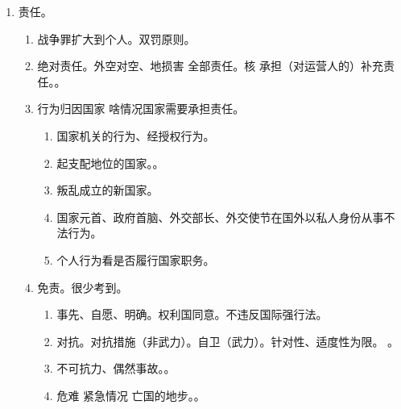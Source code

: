 \begin{enumerate}
\begin{enumerate}
                \begin{kk}{专门机构}
                  \begin{enumerate}
                    \item 通过特别协定与联合国建立合作关系的全球性政府间国际组织。。
                    \item 性质上属于独立的国际法主体，法律地位等同于联合国，不是联合国的附属机构。
                  \end{enumerate}
                \end{kk}
        \end{enumerate}
  \item 责任。
        \begin{enumerate}
          \item 战争罪扩大到个人。双罚原则。
          \item 绝对责任。外空对空、地损害 \yjt 全部责任。核 \yjt 承担（对运营人的）补充责任。。
          \item 行为归因国家 \yjt 啥情况国家需要承担责任。
                \begin{enumerate}
                  \item 国家机关的行为、经授权行为。
                  \item 起支配地位的国家。。
                  \item 叛乱成立的新国家。
                  \item 国家元首、政府首脑、外交部长、外交使节在国外以私人身份从事不法行为。
                  \item 个人行为看是否履行国家职务。
                \end{enumerate}
          \item 免责。很少考到。
                \begin{enumerate}
                  \item 事先、自愿、明确。权利国同意。不违反国际强行法。
                  \item 对抗。\yi 对抗措施（非武力）。\er 自卫（武力）。针对性、适度性为限。
                        。
                  \item 不可抗力、偶然事故。。
                  \item 危难 \hz 紧急情况 \yjt 亡国的地步。。
                \end{enumerate}
        \end{enumerate}
\end{enumerate}
